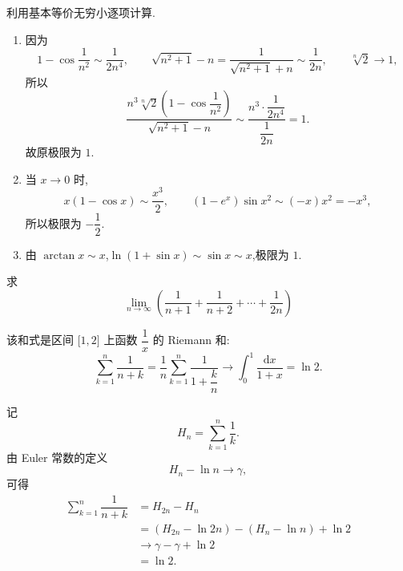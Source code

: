 \begin{solution}
    利用基本等价无穷小逐项计算.
    \begin{enumerate}
        \item 因为
              \[
                  1-\cos\dfrac{1}{n^2}\sim\dfrac{1}{2n^4},
                  \qquad
                  \sqrt{n^2+1}-n
                  =\dfrac{1}{\sqrt{n^2+1}+n}
                  \sim\dfrac{1}{2n},
                  \qquad
                  \sqrt[n]{2}\to1,
              \]
              所以
              \[
                  \dfrac{
                      n^3\sqrt[n]{2}\left(1-\cos\dfrac{1}{n^2}\right)
                  }{
                      \sqrt{n^2+1}-n
                  }
                  \sim
                  \dfrac{
                      n^3\cdot\dfrac{1}{2n^4}
                  }{
                      \dfrac{1}{2n}
                  }
                  =1.
              \]
              故原极限为 $1$.
        \item 当 $x\to0$ 时,
              \[
                  x(1-\cos x)\sim\dfrac{x^3}{2},
                  \qquad
                  (1-e^x)\sin x^2\sim(-x)x^2=-x^3,
              \]
              所以极限为 $-\dfrac{1}{2}$.
        \item 由 $\arctan x\sim x$,$\ln(1+\sin x)\sim\sin x\sim x$,极限为 $1$.
    \end{enumerate}
\end{solution}

\begin{example}
    求
    \[
        \displaystyle\lim\limits_{n\to\infty}
        \left(\dfrac{1}{n+1}+\dfrac{1}{n+2}+\cdots+\dfrac{1}{2n}\right)
    \]
\end{example}
\exampleblank

\begin{solution}

    \par\noindent{}
    该和式是区间 $\lbrack 1,2\rbrack$ 上函数 $\dfrac{1}{x}$ 的 Riemann 和:
    \[
        \displaystyle\sum\limits_{k=1}^{n}\dfrac{1}{n+k}
        =\dfrac{1}{n}\sum\limits_{k=1}^{n}
        \dfrac{1}{1+\dfrac{k}{n}}
        \longrightarrow
        \int_0^1\dfrac{\mathrm{d}x}{1+x}
        =\ln2.
    \]

    \par\medskip
    \noindent{}
    记
    \[
        H_n=\sum\limits_{k=1}^{n}\dfrac{1}{k}.
    \]
    由 Euler 常数的定义
    \[
        H_n-\ln n\longrightarrow\gamma,
    \]
    可得
    \[
        \begin{aligned}
            \sum\limits_{k=1}^{n}\dfrac{1}{n+k}
             & =H_{2n}-H_n                       \\
             & =(H_{2n}-\ln 2n)-(H_n-\ln n)+\ln2 \\
             & \longrightarrow\gamma-\gamma+\ln2 \\
             & =\ln2.
        \end{aligned}
    \]

\end{solution}

